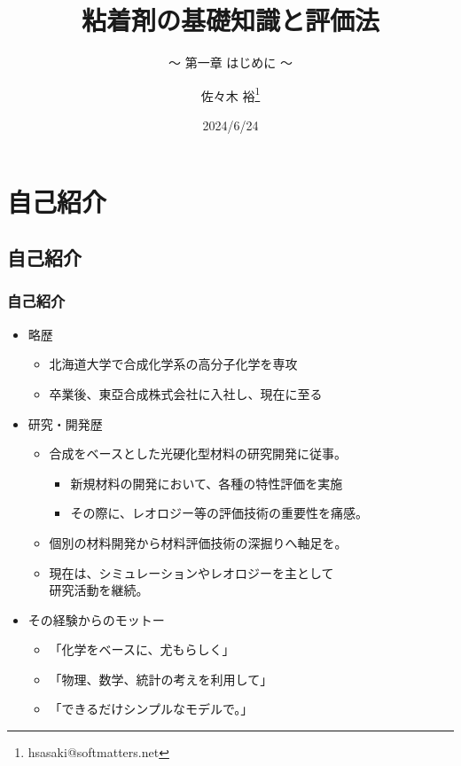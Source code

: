 \documentclass[unicode,12pt]{beamer}%
\title{粘着剤の基礎知識と評価法}
\subtitle{～ 第一章 はじめに ～}
\author[SDL Inc. 佐々木]{佐々木 裕\thanks{hsasaki@softmatters.net}}
\institute[]{元 東亞合成株式会社\\ソフトマターデザインラボ合同会社}
\date{2024/6/24}
\begin{document}
\maketitle

\begin{frame} 
    \tableofcontents[]
\end{frame} 


\section{自己紹介}
\subsection{自己紹介}
\begin{frame}
	\frametitle{自己紹介}
	\begin{itemize}
		\item 略歴
			\begin{itemize}
				\item 北海道大学で合成化学系の高分子化学を専攻
				\item 卒業後、東亞合成株式会社に入社し、現在に至る
			\end{itemize}
		\item  研究・開発歴
			\begin{itemize}
				\item 合成をベースとした光硬化型材料の研究開発に従事。
				\begin{itemize}
					\item 新規材料の開発において、各種の特性評価を実施
					\item その際に、レオロジー等の評価技術の重要性を痛感。
				\end{itemize}
				\item 個別の材料開発から材料評価技術の深掘りへ軸足を。
				\item 現在は、シミュレーションやレオロジーを主として\\研究活動を継続。
			\end{itemize}
		\item その経験からのモットー
			\begin{itemize}
				\item 「化学をベースに、尤もらしく」
				\item 「物理、数学、統計の考えを利用して」
				\item 「できるだけシンプルなモデルで。」
			\end{itemize}
	\end{itemize}
\end{frame}
\end{document}
